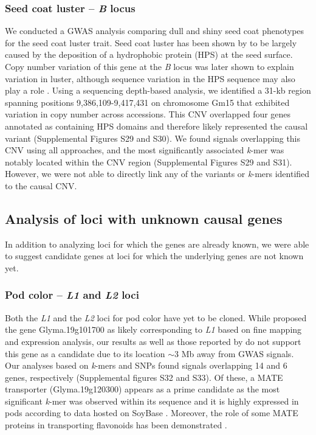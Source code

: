 \documentclass{article}
\begin{document}
\subsubsection*{Seed coat luster -- \textit{B} locus}

We conducted a GWAS analysis comparing dull and shiny seed coat phenotypes for
the seed coat luster trait. Seed coat luster has been shown by
 to be largely caused by the deposition of a hydrophobic
protein (HPS) at the seed surface. Copy number variation of this gene at the
\textit{B} locus was later shown to explain variation in luster, although
sequence variation in the HPS sequence may also play a role .
Using a sequencing depth-based analysis, we identified a 31-kb region spanning
positions 9,386,109-9,417,431 on chromosome Gm15 that exhibited variation in
copy number across accessions. This CNV overlapped four genes annotated as
containing HPS domains and therefore likely represented the causal variant
(Supplemental Figures S29 and
S30).  We found signals overlapping this
CNV using all approaches, and the most significantly associated \textit{k}-mer
was notably located within the CNV region (Supplemental Figures
S29 and
S31). However, we were not able to
directly link any of the variants or \textit{k}-mers identified to the causal
CNV.

\subsection*{Analysis of loci with unknown causal genes}

In addition to analyzing loci for which the genes are already known, we were
able to suggest candidate genes at loci for which the underlying genes are not
known yet. 

\subsubsection*{Pod color -- \textit{L1} and \textit{L2} loci}

Both the \textit{L1} and the \textit{L2} loci for pod color have yet to be
cloned. While  proposed the gene Glyma.19g101700 as likely
corresponding to \textit{L1} based on fine mapping and expression analysis, our
results as well as those reported by  do not support this
gene as a candidate due to its location $\sim$3 Mb away from GWAS signals. Our
analyses based on \textit{k}-mers and SNPs found signals overlapping 14 and
6 genes, respectively (Supplemental figures S32 and
S33). Of these, a MATE transporter (Glyma.19g120300)
appears as a prime candidate as the most significant \emph{k}-mer was observed
within its sequence and it is highly expressed in pods according to data hosted
on SoyBase . Moreover, the role of some MATE
proteins in transporting flavonoids has been demonstrated .
\end{document}
